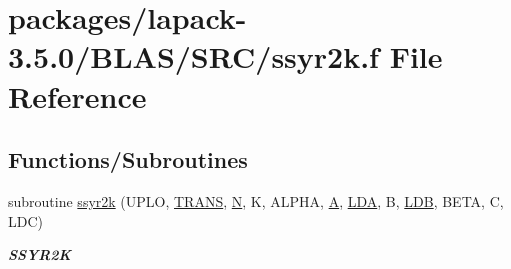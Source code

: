 \hypertarget{lapack-3_85_80_2BLAS_2SRC_2ssyr2k_8f}{}\section{packages/lapack-\/3.5.0/\+B\+L\+A\+S/\+S\+R\+C/ssyr2k.f File Reference}
\label{lapack-3_85_80_2BLAS_2SRC_2ssyr2k_8f}
\subsection*{Functions/\+Subroutines}
\begin{DoxyCompactItemize}
\item 
subroutine \hyperlink{group__single__blas__level3_ga6ee4760a413296c246b1ecbc1ac985a0}{ssyr2k} (U\+P\+L\+O, \hyperlink{superlu__enum__consts_8h_a0c4e17b2d5cea33f9991ccc6a6678d62a1f61e3015bfe0f0c2c3fda4c5a0cdf58}{T\+R\+A\+N\+S}, \hyperlink{polmisc_8c_a0240ac851181b84ac374872dc5434ee4}{N}, K, A\+L\+P\+H\+A, \hyperlink{classA}{A}, \hyperlink{example__user_8c_ae946da542ce0db94dced19b2ecefd1aa}{L\+D\+A}, B, \hyperlink{example__user_8c_a50e90a7104df172b5a89a06c47fcca04}{L\+D\+B}, B\+E\+T\+A, C, L\+D\+C)
\begin{DoxyCompactList}\small\item\em {\bfseries S\+S\+Y\+R2\+K} \end{DoxyCompactList}\end{DoxyCompactItemize}
